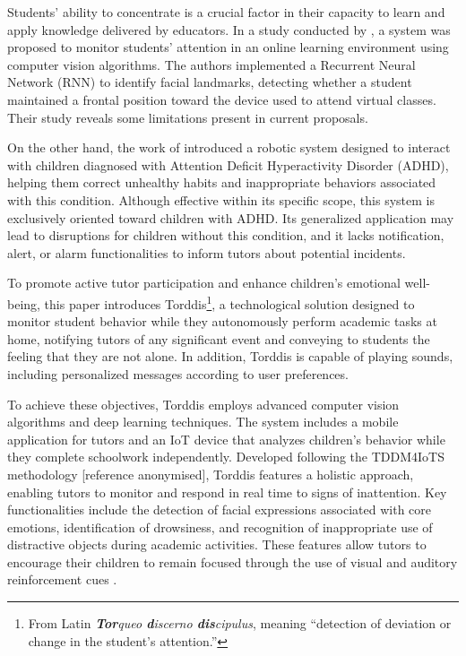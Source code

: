 		Students' ability to concentrate is a crucial factor in their capacity to learn and apply knowledge delivered by educators. In a study conducted by \cite{Terraza2022}, a system was proposed to monitor students’ attention in an online learning environment using computer vision algorithms. The authors implemented a Recurrent Neural Network (RNN) to identify facial landmarks, detecting whether a student maintained a frontal position toward the device used to attend virtual classes. Their study reveals some limitations present in current proposals.
		
		On the other hand, the work of \cite{Berrezueta-Guzman2021} introduced a robotic system designed to interact with children diagnosed with Attention Deficit Hyperactivity Disorder (ADHD), helping them correct unhealthy habits and inappropriate behaviors associated with this condition. Although effective within its specific scope, this system is exclusively oriented toward children with ADHD. Its generalized application may lead to disruptions for children without this condition, and it lacks notification, alert, or alarm functionalities to inform tutors about potential incidents.
		
		To promote active tutor participation and enhance children’s emotional well-being, this paper introduces Torddis\footnote{From Latin \textit{\textbf{Tor}queo \textbf{d}iscerno \textbf{dis}cipulus}, meaning ``detection of deviation or change in the student’s attention.''}, a technological solution designed to monitor student behavior while they autonomously perform academic tasks at home, notifying tutors of any significant event and conveying to students the feeling that they are not alone. In addition, Torddis is capable of playing sounds, including personalized messages according to user preferences.
		
		To achieve these objectives, Torddis employs advanced computer vision algorithms and deep learning techniques. The system includes a mobile application for tutors and an IoT device that analyzes children's behavior while they complete schoolwork independently. Developed following the TDDM4IoTS methodology [reference anonymised], Torddis features a holistic approach, enabling tutors to monitor and respond in real time to signs of inattention. Key functionalities include the detection of facial expressions associated with core emotions, identification of drowsiness, and recognition of inappropriate use of distractive objects during academic activities. These features allow tutors to encourage their children to remain focused through the use of visual and auditory reinforcement cues \citep{Al-Gburi2023,Enadula2021,Terraza2022}.
		
